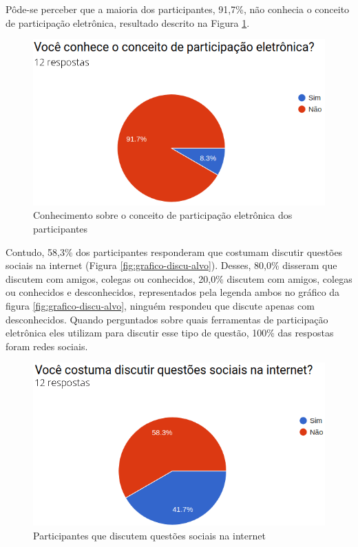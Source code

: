 \par
Pôde-se perceber que a maioria dos participantes, 91,7\%, não conhecia o conceito de participação eletrônica, resultado descrito na Figura \ref{fig:grafico-participacao}.

\begin{figure}[!ht]
    \centering
    \includegraphics[scale=0.4]{./figuras/conhece_participacao_eletronica.png}
    \caption{Conhecimento sobre o conceito de participação eletrônica dos participantes}
    \label{fig:grafico-participacao}
\end{figure}

\par
Contudo, 58,3\% dos participantes responderam que costumam discutir questões sociais na internet (Figura \ref{fig:grafico-discu-alvo}). 
Desses, 80,0\% disseram que  discutem com amigos, colegas ou conhecidos, 20,0\% discutem com amigos, colegas ou conhecidos e desconhecidos, representados pela legenda ambos
no gráfico da figura \ref{fig:grafico-discu-alvo}, ninguém respondeu que discute apenas com desconhecidos. Quando perguntados sobre quais ferramentas de participação 
eletrônica eles utilizam para discutir esse tipo de questão, 100\% das respostas foram redes sociais. 

\begin{figure}[!ht]
    \centering
    \includegraphics[scale=0.4]{./figuras/discutir.png}
    \caption{Participantes que discutem questões sociais na internet}
    \label{fig:grafico-discu}
\end{figure}

